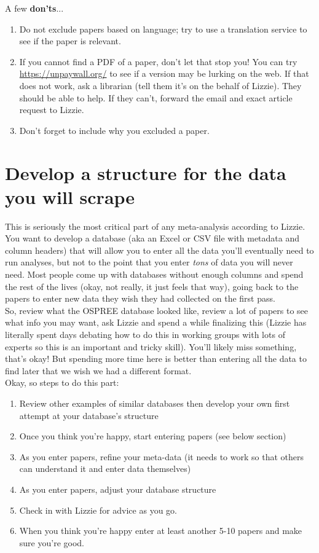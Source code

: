 \documentclass{article}[11pt]
\begin{document}
A few {\bf don'ts}...
\begin{enumerate}
\item Do not exclude papers based on language; try to use a translation service to see if the paper is relevant. 
\item If you cannot find a PDF of a paper, don't let that stop you! You can try \href{unpaywall}{https://unpaywall.org/} to see if a version may be lurking on the web. If that does not work, ask a librarian (tell them it's on the behalf of Lizzie). They should be able to help. If they can't, forward the email and exact article request to Lizzie.
\item Don't forget to include why you excluded a paper.
\end{enumerate}

\section{Develop a structure for the data you will scrape}

This is seriously the most critical part of any meta-analysis according to Lizzie. You want to develop a database (aka an Excel or CSV file with metadata and column headers) that will allow you to enter all the data you'll eventually need to run analyses, but not to the point that you enter \emph{tons} of data you will never need. Most people come up with databases without enough columns and spend the rest of the lives (okay, not really, it just feels that way), going back to the papers to enter new data they wish they had collected on the first pass. \\

So, review what the OSPREE database looked like, review a lot of papers to see what info you may want, ask Lizzie and spend a while finalizing this (Lizzie has literally spent days debating how to do this in working groups with lots of experts so this is an important and tricky skill). You'll likely miss something, that's okay! But spending more time here is better than entering all the data to find later that we wish we had a different format. \\

Okay, so steps to do this part:
\begin{enumerate}
\item Review other examples of similar databases then develop your own first attempt at your database's structure
\item Once you think you're happy, start entering papers (see below section)
\item As you enter papers, refine your meta-data (it needs to work so that others can understand it and enter data themselves)
\item As you enter papers, adjust your database structure
\item Check in with Lizzie for advice as you go. 
\item When you think you're happy enter at least another 5-10 papers and make sure you're good.
\end{enumerate}
\end{document}
